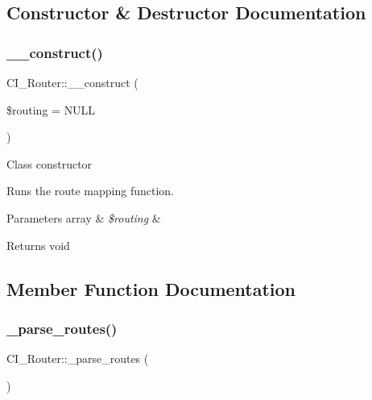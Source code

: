 \subsection{Constructor \& Destructor Documentation}
\mbox{\label{class_c_i___router_af6992558cad4491d83f68403bf18cf71}} 
\subsubsection{\texorpdfstring{\+\_\+\+\_\+construct()}{\_\_construct()}}
{\footnotesize\ttfamily C\+I\+\_\+\+Router\+::\+\_\+\+\_\+construct (\begin{DoxyParamCaption}\item[{}]{\$routing = {\ttfamily NULL} }\end{DoxyParamCaption})}

Class constructor

Runs the route mapping function.


\begin{DoxyParams}[1]{Parameters}
array & {\em \$routing} & \\
\hline
\end{DoxyParams}
\begin{DoxyReturn}{Returns}
void 
\end{DoxyReturn}


\subsection{Member Function Documentation}
\mbox{\label{class_c_i___router_a1b8a6b811df185009b34f3cf1c3a21e6}} 
\subsubsection{\texorpdfstring{\+\_\+parse\+\_\+routes()}{\_parse\_routes()}}
{\footnotesize\ttfamily C\+I\+\_\+\+Router\+::\+\_\+parse\+\_\+routes (\begin{DoxyParamCaption}{ }\end{DoxyParamCaption})\hspace{0.3cm}{\ttfamily [protected]}}


